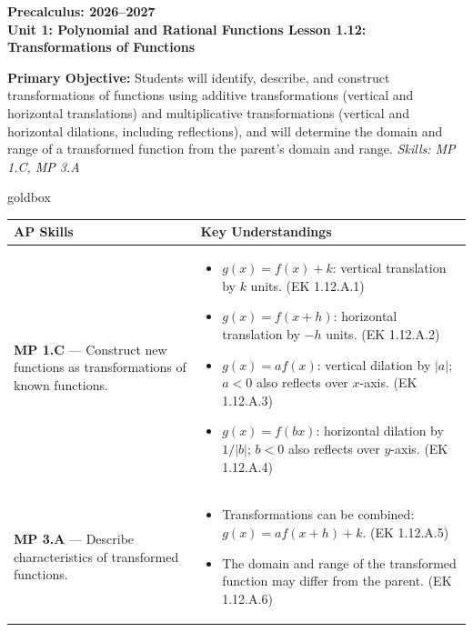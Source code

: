 \documentclass[10pt]{article}
\newcommand{\CourseName}{Precalculus}
\newcommand{\SchoolYear}{2026--2027}
\newcommand{\UnitNumberName}{Unit 1: Polynomial and Rational Functions \quad}
\newcommand{\LessonNumberName}{Lesson 1.12: Transformations of Functions}
\begin{document}
\begin{center}
    {\Large\bfseries \CourseName: \SchoolYear \\
    {\small\bfseries \UnitNumberName \LessonNumberName}}
\end{center}

\begin{tcolorbox}[colback=sky, colframe=navy, boxrule=0.9pt, arc=2mm,
    left=2mm, right=2mm, top=1.5mm, bottom=1.5mm]
    \textbf{Primary Objective:} Students will identify, describe, and construct transformations
    of functions using additive transformations (vertical and horizontal translations) and
    multiplicative transformations (vertical and horizontal dilations, including reflections),
    and will determine the domain and range of a transformed function from the parent's domain
    and range.
    \hfill\textit{\small Skills: MP 1.C, MP 3.A}
\end{tcolorbox}

\renewcommand{\arraystretch}{1.6}
\begin{skillbox}{goldbox}
\begin{tabularx}{\linewidth}{@{}X X@{}}
\textbf{AP Skills} &
\textbf{Key Understandings} \\
\midrule
\textbf{MP 1.C} --- Construct new functions as transformations of known functions. &
\begin{itemize}[leftmargin=1.2em,itemsep=2pt,topsep=0pt]
  \item $g(x)=f(x)+k$: vertical translation by $k$ units. (EK 1.12.A.1)
  \item $g(x)=f(x+h)$: horizontal translation by $-h$ units. (EK 1.12.A.2)
  \item $g(x)=af(x)$: vertical dilation by $|a|$; $a<0$ also reflects over $x$-axis. (EK 1.12.A.3)
  \item $g(x)=f(bx)$: horizontal dilation by $1/|b|$; $b<0$ also reflects over $y$-axis. (EK 1.12.A.4)
\end{itemize} \\
\textbf{MP 3.A} --- Describe characteristics of transformed functions. &
\begin{itemize}[leftmargin=1.2em,itemsep=2pt,topsep=0pt]
  \item Transformations can be combined: $g(x)=af(x+h)+k$. (EK 1.12.A.5)
  \item The domain and range of the transformed function may differ from the parent. (EK 1.12.A.6)
\end{itemize} \\
\end{tabularx}
\end{skillbox}
\end{document}
